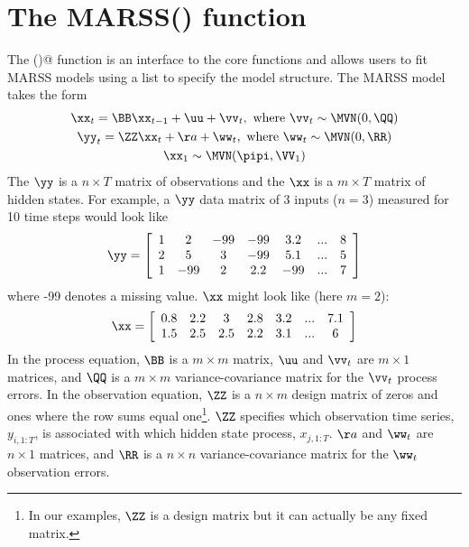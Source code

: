 \chapter{The MARSS() function}\label{chap:MARSS}

The \verb@MARSS()@ function is an interface to the core functions and allows users to fit MARSS models using a list to specify the model structure.  The MARSS model takes the form
\begin{subequations}\label{eqn:mgompertz}
\begin{gather}
	\xx_t = \BB \xx_{t-1} + \uu + \vv_{t}, \text{ where } \vv_{t} \sim \MVN(0,\QQ)\label{eqn:mgompertzX}\\
	\yy_t = \ZZ \xx_t + \aa + \ww_t, \text{ where } \ww_t \sim \MVN(0,\RR)\label{eqn:mgompertzY}\\
	\xx_1 \sim \MVN(\pipi,\VV_1) \label{eqn:mgompertzX1}
\end{gather}
\end{subequations}
The $\yy$ is a $n \times T$ matrix of observations and the $\xx$ is a $m \times T$ matrix of hidden states.  For example, a $\yy$ data matrix of 3 inputs ($n=3$) measured for 10 time steps would look like
\begin{equation*}
\yy = \left[ \begin{array}{ccccccc}
    1 & 2 & -99 & -99 & 3.2 & ... &8\\
    2 & 5 &  3 & -99 & 5.1 & ... &5\\
    1 &-99 & 2 & 2.2 & -99 & ... &7\end{array} \right]
\end{equation*}
where -99 denotes a missing value.  $\xx$ might look like (here $m=2$):
\begin{equation*}
\xx = \left[ \begin{array}{ccccccc}
    0.8 & 2.2 & 3 & 2.8 & 3.2 & ... &7.1\\
    1.5 & 2.5 & 2.5 & 2.2 & 3.1 & ... &6\end{array} \right]
\end{equation*}
In the process equation, $\BB$ is a $m \times m$ matrix, $\uu$ and $\vv_t$ are $m \times 1$ matrices, and $\QQ$ is a $m \times m$ variance-covariance matrix for the $\vv_t$ process errors.  In the observation equation, $\ZZ$ is a $n \times m$ design matrix of zeros and ones where the row sums equal one\footnote{In our examples, $\ZZ$ is a design matrix but it can actually be any fixed matrix.}.  $\ZZ$ specifies which observation time series, $y_{i,1:T}$, is associated with which hidden state process, $x_{j,1:T}$. $\aa$ and $\ww_t$ are $n \times 1$ matrices, and $\RR$ is a $n \times n$ variance-covariance matrix for the $\ww_t$ observation errors.
 
